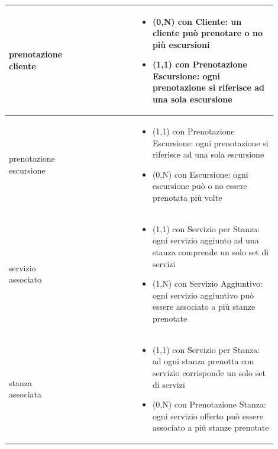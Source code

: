 \documentclass[12pt,a4paper]{article}
\begin{document}
\begin{center}
\begin{longtable}{|p{0.16\linewidth}|p{0.24\linewidth}|p{0.50\linewidth}|}
\hline
prenotazione cliente 				&   
					& \begin{itemize}
						\setlength{\itemindent}{-1em}
						\vspace{-25pt}
						\setlength\itemsep{-0.25em}
						\item (0,N) con Cliente: un cliente può prenotare o no più escursioni
						\item (1,1) con Prenotazione Escursione: ogni prenotazione si riferisce ad una sola escursione
					\end{itemize}\\ 

\hline
prenotazione escursione 				&   
					& \begin{itemize}
						\setlength{\itemindent}{-1em}
						\vspace{-25pt}
						\setlength\itemsep{-0.25em}
						\item (1,1) con Prenotazione Escursione: ogni prenotazione si riferisce ad una sola escursione
						\item (0,N) con Escursione: ogni escursione può o no essere prenotata più volte
					\end{itemize}\\ 

\hline
servizio associato 				&  
					& \begin{itemize}
						\setlength{\itemindent}{-1em}
						\vspace{-25pt}
						\setlength\itemsep{-0.25em}
						\item (1,1) con Servizio per Stanza: ogni servizio aggiunto ad una stanza comprende un solo set di servizi
						\item (1,N) con Servizio Aggiuntivo: ogni servizio aggiuntivo può essere associato a più stanze prenotate
					\end{itemize}\\ 

\hline
stanza associata 				&   
					& \begin{itemize}
						\setlength{\itemindent}{-1em}
						\vspace{-25pt}
						\setlength\itemsep{-0.25em}
						\item (1,1) con Servizio per Stanza: ad ogni stanza prenotta con servizio corrisponde un solo set di servizi
						\item (0,N) con Prenotazione Stanza: ogni servizio offerto può essere associato a più stanze prenotate
					\end{itemize}\\ 

\hline

\end{longtable}
\end{center}
\pagebreak
\end{document}
